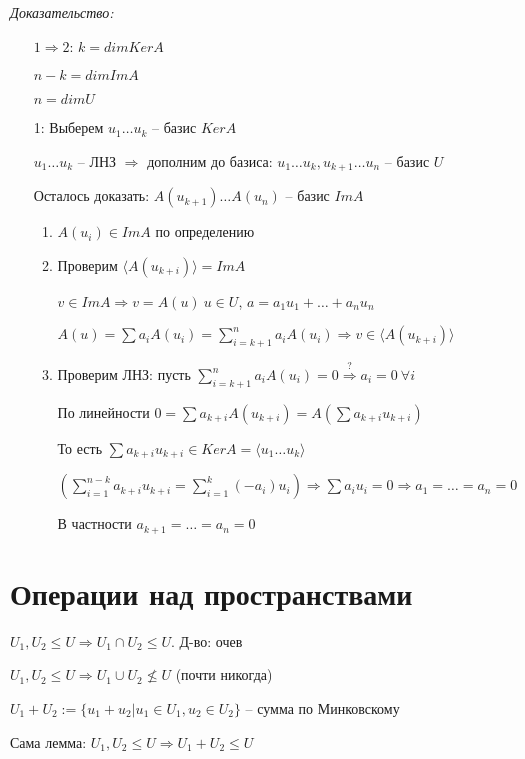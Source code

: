 \documentclass[12pt]{article}
\newcommand{\q}[1]{\langle #1 \rangle}
\begin{document}
\textit{Доказательство:}

\begin{itemize}
    \item[$1 \Rightarrow 2$:] $k = dimKerA$
    
    $n - k = dimImA$

    $n = dimU$

    \item[1:] Выберем $u_1 \ldots u_k$ -- базис $KerA$
    
    $u_1 \ldots u_k$ -- ЛНЗ $\Rightarrow$ дополним до базиса: $u_1 \ldots u_k, u_{k + 1} \ldots u_n$ -- базис $U$

    Осталось доказать: $A(u_{k + 1}) \ldots A(u_n)$ -- базис $ImA$

    \begin{enumerate}
        \item $A(u_i) \in ImA$ по определению
        \item Проверим $\q{A(u_{k + i})} = ImA$
        
        $v \in ImA \Rightarrow v = A(u)\ u \in U$, $a = a_1u_1 + \ldots + a_nu_n$

        $A(u) = \sum a_iA(u_i) = \sum\limits_{i = k + 1}^n a_iA(u_i) \Rightarrow v \in \q{A(u_{k + i})}$

        \item Проверим ЛНЗ: пусть $\sum\limits_{i = k + 1}^n a_iA(u_i) = 0 \stackrel{?}{\Rightarrow} a_i = 0\ \forall i$
        
        По линейности $0 = \sum a_{k + i}A(u_{k + i}) = A(\sum a_{k + i}u_{k + i})$

        То есть $\sum a_{k + i}u_{k + i} \in KerA = \q{u_1 \ldots u_k}$

        $(\sum\limits_{i = 1}^{n - k} a_{k + i}u_{k + i} = \sum\limits_{i = 1}^k (-a_i)u_i) \Rightarrow \sum a_iu_i = 0 \Rightarrow a_1 = \ldots = a_n = 0$

        В частности $a_{k + 1} = \ldots = a_n = 0$
    \end{enumerate}
\end{itemize}

\section{Операции над пространствами}

\begin{lem}{}
    $U_1, U_2 \leq U \Rightarrow U_1 \cap U_2 \leq U$. Д-во: очев

    $U_1, U_2 \leq U \Rightarrow U_1 \cup U_2 \not\leq U$ (почти никогда)

    $U_1 + U_2 := \{ u_1 + u_2 | u_1 \in U_1, u_2 \in U_2 \}$ -- сумма по Минковскому

    Сама лемма: $U_1, U_2 \leq U \Rightarrow U_1 + U_2 \leq U$
\end{lem}
\end{document}
